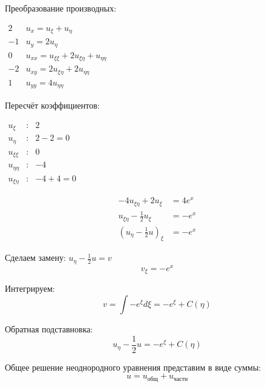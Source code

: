 \documentclass[a4paper,12pt]{article}
\begin{document}
Преобразование производных:
\begin{flushleft}
\(
\begin{array}{r|l}
2 & u_x = u_{\xi} + u_{\eta} \\
-1 & u_y = 2u_{\eta} \\
0 & u_{xx} = u_{\xi\xi} + 2 u_{\xi\eta} + u_{\eta\eta} \\
-2 & u_{xy} = 2 u_{\xi\eta} + 2 u_{\eta\eta} \\
1 & u_{yy} = 4 u_{\eta\eta}
\end{array}
\)
\end{flushleft}

Пересчёт коэффициентов:
\begin{flushleft}
\(
\begin{array}{rcl}
    u_{\xi} &:& 2 \\
    u_{\eta} &:& 2-2=0 \\
    u_{\xi\xi} &:& 0 \\
    u_{\eta\eta} &:& -4 \\
    u_{\xi\eta} &:& -4 + 4 = 0
\end{array}
\)
\end{flushleft}
\begin{equation*}
    \begin{aligned}
        -4u_{\xi\eta} + 2u_{\xi} &= 4e^x \\
        u_{\xi\eta} - \frac{1}{2} u_{\xi} &= -e^x \\
        \left( u_{\eta} - \frac{1}{2} u \right)_{\xi} &= -e^x
    \end{aligned}
\end{equation*}

Сделаем замену: $ u_{\eta} - \frac{1}{2} u = v$
\begin{equation*}
v_{\xi}=-e^x
\end{equation*}

Интегрируем:
\begin{equation*}
    v = \int  - e^{\xi} d\xi =  - e^{\xi} + C(\eta)
\end{equation*}

Обратная подставновка:
\begin{equation*}
    u_{\eta} - \frac{1}{2} u= - e^{\xi} + C(\eta)
\end{equation*}

Общее решение неоднородного уравнения представим в виде суммы:
\begin{equation*}
    u = u_{\text{общ}} + u_{\text{частн}}
\end{equation*}
\end{document}

